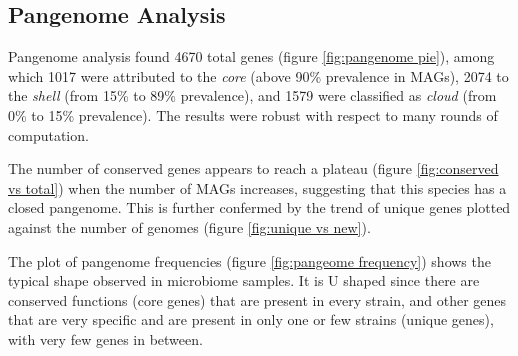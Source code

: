 \subsection*{Pangenome Analysis}
\graphicspath{{images/pangenomeAnalysis}}






Pangenome analysis found 4670 total genes (figure \ref{fig:pangenome pie}), 
among which 1017 were attributed to the \emph{core} (above 90\% prevalence in MAGs),
2074 to the \emph{shell} (from 15\% to 89\% prevalence), and 1579 were classified as \emph{cloud}
(from 0\% to 15\% prevalence). The results were robust with respect to many rounds of computation.

The number of conserved genes appears to reach a plateau (figure \ref{fig:conserved vs total})
when the number of MAGs increases, suggesting that this species has a closed pangenome.
This is further confermed by the trend of unique genes plotted against the number of
genomes (figure \ref{fig:unique vs new}).

The plot of pangenome frequencies (figure \ref{fig:pangeome frequency}) shows the typical shape observed in microbiome samples.
It is U shaped since there are conserved functions (core genes) that are present in every strain, and
other genes that are very specific and are present in only one or few strains (unique genes), with very few genes in between.

